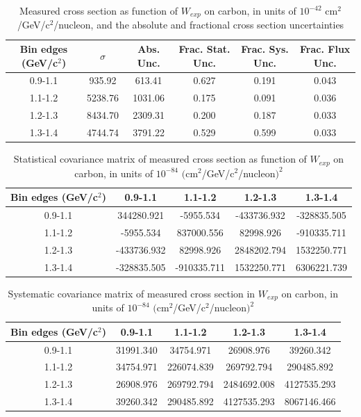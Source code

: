 \documentclass[../main.tex]{subfiles}
\begin{document}
\pagebreak
\begin{turnpage}
\end{turnpage}
\begin{table}
  \centering
  \renewcommand{\arraystretch}{1.15}
  \caption{Measured cross section as function of $W_{exp}$ on carbon, in units of $10^{-42}$ $\text{cm}^2$/GeV/c${}^2$/nucleon, and the absolute and fractional cross section uncertainties}
    \begin{tabular}{c||c|c||c|c|c}
      Bin edges (GeV/c${}^2$) &  $\sigma$  &  Abs. Unc.  &  Frac. Stat. Unc.  &  Frac. Sys. Unc.  &  Frac. Flux Unc. \\
      \hline
      \hline
      0.9-1.1 & 935.92 & 613.41 & 0.627 & 0.191 & 0.043\\
      1.1-1.2 & 5238.76 & 1031.06 & 0.175 & 0.091 & 0.036\\
      1.2-1.3 & 8434.70 & 2309.31 & 0.200 & 0.187 & 0.033\\
      1.3-1.4 & 4744.74 & 3791.22 & 0.529 & 0.599 & 0.033
    \end{tabular}
  \label{tbl:datanucleonnuc6Wa}
\end{table}
\begin{table}
  \centering
  \renewcommand{\arraystretch}{1.15}
  \caption{Statistical covariance matrix of measured cross section as function of $W_{exp}$ on carbon, in units of $10^{-84}$ $(\text{cm}^2$/GeV/c${}^2$/nucleon$)^2$}
    \begin{tabular}{c||cccc}
      Bin edges (GeV/c${}^2$) & 0.9-1.1 & 1.1-1.2 & 1.2-1.3 & 1.3-1.4\\
      \hline
      \hline
      0.9-1.1 & 344280.921 & -5955.534 & -433736.932 & -328835.505\\
      1.1-1.2 & -5955.534 & 837000.556 & 82998.926 & -910335.711\\
      1.2-1.3 & -433736.932 & 82998.926 & 2848202.794 & 1532250.771\\
      1.3-1.4 & -328835.505 & -910335.711 & 1532250.771 & 6306221.739
    \end{tabular}
  \label{tbl:statnucleonnuc6Wb}
\end{table}
\begin{table}
  \centering
  \renewcommand{\arraystretch}{1.15}
  \caption{Systematic covariance matrix of measured cross section in $W_{exp}$ on carbon, in units of $10^{-84}$ $(\text{cm}^2$/GeV/c${}^2$/nucleon$)^2$}
    \begin{tabular}{c||cccc}
      Bin edges (GeV/c${}^2$) & 0.9-1.1 & 1.1-1.2 & 1.2-1.3 & 1.3-1.4\\
      \hline
      \hline
      0.9-1.1 & 31991.340 & 34754.971 & 26908.976 & 39260.342\\
      1.1-1.2 & 34754.971 & 226074.839 & 269792.794 & 290485.892\\
      1.2-1.3 & 26908.976 & 269792.794 & 2484692.008 & 4127535.293\\
      1.3-1.4 & 39260.342 & 290485.892 & 4127535.293 & 8067146.466
    \end{tabular}
  \label{tbl:sysnucleonnuc6Wc}
\end{table}
\end{document}
